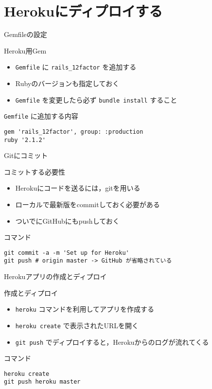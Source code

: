 \documentclass[t, aspectratio=169]{beamer}
\begin{document}
\section{Herokuにディプロイする}
\label{sec-6-3}
\begin{frame}[fragile,label=sec-6-3-1]{Gemfileの設定}
 \begin{block}{Heroku用Gem}
\begin{itemize}
\item \texttt{Gemfile} に \texttt{rails\_12factor} を追加する
\item Rubyのバージョンも指定しておく
\item \texttt{Gemfile} を変更したら必ず \texttt{bundle install} すること
\end{itemize}
\end{block}
\begin{block}{\texttt{Gemfile} に追加する内容}
\begin{verbatim}
gem 'rails_12factor', group: :production
ruby '2.1.2'
\end{verbatim}
\end{block}
\end{frame}
\begin{frame}[fragile,label=sec-6-3-2]{Gitにコミット}
 \begin{block}{コミットする必要性}
\begin{itemize}
\item Herokuにコードを送るには，gitを用いる
\item ローカルで最新版をcommitしておく必要がある
\item ついでにGitHubにもpushしておく
\end{itemize}
\end{block}

\begin{block}{コマンド}
\begin{verbatim}
git commit -a -m 'Set up for Heroku'
git push # origin master -> GitHub が省略されている
\end{verbatim}
\end{block}
\end{frame}
\begin{frame}[fragile,label=sec-6-3-3]{Herokuアプリの作成とディプロイ}
 \begin{block}{作成とディプロイ}
\begin{itemize}
\item \texttt{heroku} コマンドを利用してアプリを作成する
\item \texttt{heroku create} で表示されたURLを開く
\item \texttt{git push} でディプロイすると，Herokuからのログが流れてくる
\end{itemize}
\end{block}

\begin{block}{コマンド}
\begin{verbatim}
heroku create
git push heroku master
\end{verbatim}
\end{block}
\end{frame}
\end{document}
